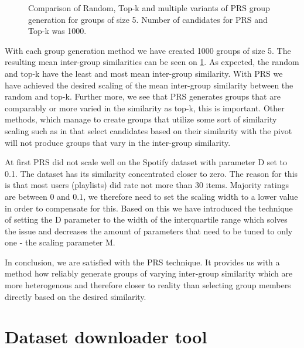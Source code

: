 \begin{figure}[ht!]
    \caption[Comparison of Random, Top-k and multiple variants of PRS group generation of size 5.]{Comparison of Random, Top-k and multiple variants of PRS group generation for groups of size 5. Number of candidates for PRS and Top-k was 1000.}
    \label{fig:inter_group_means}
\end{figure}

With each group generation method we have created 1000 groups of size 5. The resulting mean inter-group similarities can be seen on  \ref{fig:inter_group_means}. As expected, the random and top-k have the least and most mean inter-group similarity. With PRS we have achieved the desired scaling of the mean inter-group similarity between the random and top-k. Further more, we see that PRS generates groups that are comparably or more varied in the similarity as top-k, this is important. Other methods, which manage to create groups that utilize some sort of similarity scaling such as in \cite{GFAR-kaya2020} that select candidates based on their similarity with the pivot will not produce groups that vary in the inter-group similarity.

At first PRS did not scale well on the Spotify dataset with parameter D set to 0.1. The dataset has its similarity concentrated closer to zero. The reason for this is that most users (playlists) did rate not more than 30 items. Majority ratings are between $0$ and $0.1$, we therefore need to set the scaling width to a lower value in order to compensate for this. Based on this we have introduced the technique of setting the D parameter to the width of the interquartile range which solves the issue and decreases the amount of parameters that need to be tuned to only one - the scaling parameter M. 

In conclusion, we are satisfied with the PRS technique. It provides us with a method how reliably generate groups of varying inter-group similarity which are more heterogenous and therefore closer to reality than selecting group members directly based on the desired similarity.

\section{Dataset downloader tool}

